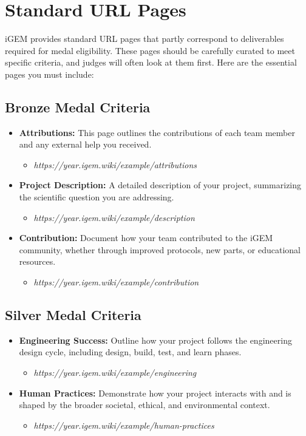 

\section{Standard URL Pages} 

iGEM provides standard URL pages that partly correspond to deliverables required for medal eligibility.
These pages should be carefully curated to meet specific criteria, and judges will often look at them first.
Here are the essential pages you must include:

\subsection*{Bronze Medal Criteria} 
\begin{itemize}
\item \textbf{Attributions:} This page outlines the contributions of each team member and any external help you received.
\begin{itemize}
    \item \textit{https://year.igem.wiki/example/attributions}
\end{itemize}
\item \textbf{Project Description:} A detailed description of your project, summarizing the scientific question you are addressing.
\begin{itemize}
    \item  \textit{https://year.igem.wiki/example/description}
\end{itemize}
\item \textbf{Contribution:} Document how your team contributed to the iGEM community, whether through improved protocols, new parts, or educational resources.
\begin{itemize}
    \item  \textit{https://year.igem.wiki/example/contribution}
\end{itemize}
\end{itemize}

\subsection*{Silver Medal Criteria} 
\begin{itemize}
\item \textbf{Engineering Success:} Outline how your project follows the engineering design cycle, including design, build, test, and learn phases.
\begin{itemize}
    \item  \textit{https://year.igem.wiki/example/engineering}
\end{itemize}
\item \textbf{Human Practices:} Demonstrate how your project interacts with and is shaped by the broader societal, ethical, and environmental context.
\begin{itemize}
    \item  \textit{https://year.igem.wiki/example/human-practices}
\end{itemize}
\end{itemize}

